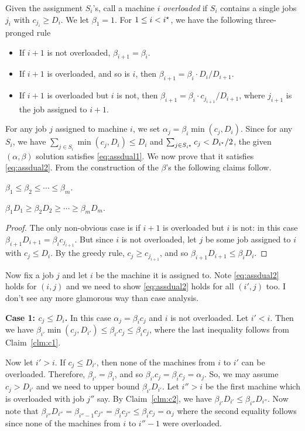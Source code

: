 Given the assignment $S_i$'s, call a machine $i$ {\em overloaded} if $S_i$ contains a single jobs $j_i$ with $c_{j_i} \geq D_i$. 
We let $\beta_1 = 1$. For $1\leq i <i^\star$, we have the following three-pronged rule
\begin{itemize}[noitemsep]
	\item If $i+1$ is not overloaded, $\beta_{i+1} = \beta_i$.
	\item If $i+1$ is overloaded, and so is $i$, then $\beta_{i+1} = \beta_i \cdot D_i/D_{i+1}$.
	\item If $i+1$ is overloaded but $i$ is not, then $\beta_{i+1} = \beta_i \cdot c_{j_{i+1}}/D_{i+1}$, where $j_{i+1}$ is the job assigned to $i+1$.
\end{itemize}
For any job $j$ assigned to machine $i$, we set $\alpha_j = \beta_i \min(c_j,D_i)$. Since for any $S_i$, we have $\sum_{j\in S_i} \min(c_j,D_i) \leq D_i$ and $\sum_{j\in S_{i^\star}} c_j < D_{i^\star}/2$,  the given $(\alpha,\beta)$ solution satisfies \eqref{eq:assdual1}. We now prove that it satisfies \eqref{eq:assdual2}.
From the construction of the $\beta$'s the following claims follow.
\begin{claim}\label{clm:c1}
$\beta_1\leq \beta_2 \leq \cdots \leq \beta_m$.
\end{claim}
\begin{claim}\label{clm:c2}
$\beta_1D_1 \geq \beta_2D_2 \geq \cdots \geq \beta_mD_m$.
\end{claim}
\begin{proof}
	The only non-obvious case is if $i+1$ is overloaded but $i$ is not: in this case $\beta_{i+1}D_{i+1} = \beta_ic_{j_{i+1}}$. But since $i$ is not overloaded, let $j$ be some job assigned to $i$ with $c_j \leq D_i$.
	By the greedy rule, $c_j \geq c_{j_{i+1}}$, and so $\beta_{i+1}D_{i+1} \leq \beta_iD_i$.
\end{proof}
\noindent
Now fix a job $j$ and let $i$ be the machine it is assigned to. Note \eqref{eq:assdual2} holds for $(i,j)$ and we need to show \eqref{eq:assdual2} holds for all $(i',j)$ too.
I don't see any more glamorous way than case analysis. \smallskip

\noindent
{\bf Case 1: $c_j \leq D_i$.} In this case $\alpha_j = \beta_ic_j$ and $i$ is not overloaded. 
Let $i' < i$.  Then we have $\beta_{i'}\min(c_j,D_{i'}) \le \beta_{i'}c_j \leq \beta_ic_j$, where the last inequality follows from Claim~\ref{clm:c1}.

Now let $i' > i$. If $c_j \leq D_{i'}$, then none of the machines from $i$ to $i'$ can be overloaded. Therefore, $\beta_{i'} = \beta_i$, and so $\beta_{i'}c_j = \beta_ic_j = \alpha_j$.
So, we may assume $c_j > D_{i'}$ and we need to upper bound $\beta_{i'}D_{i'}$. Let $i'' > i$ be the first machine which is overloaded with job $j''$ say.
By Claim~\ref{clm:c2}, we have $\beta_{i'}D_{i'} \leq \beta_{i''}D_{i''}$. Now note that
$\beta_{i''}D_{i''}  = \beta_{i''-1}c_{j''} = \beta_ic_{j''} \leq \beta_ic_j = \alpha_j$ where the second equality follows since none of the machines from $i$ to $i''-1$ were overloaded. \smallskip

